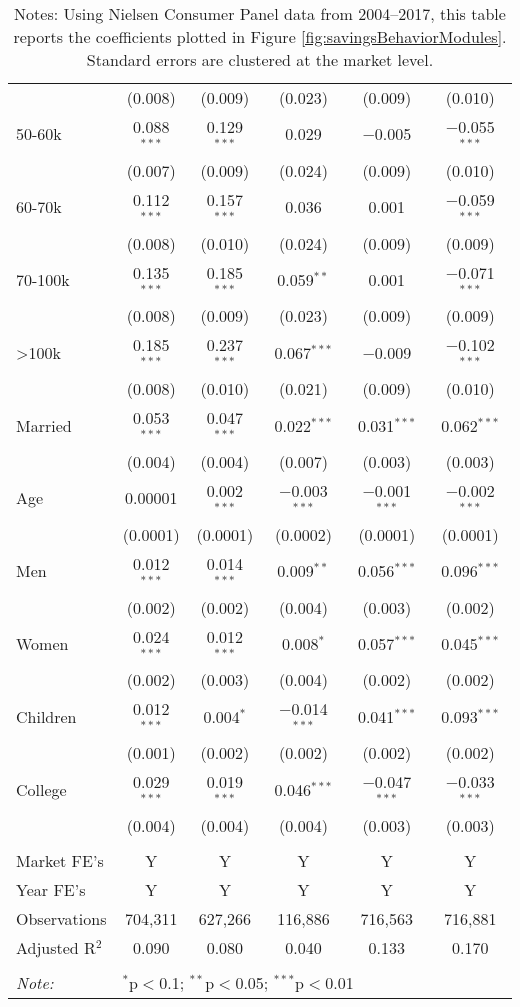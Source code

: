 \begin{table}[!htbp]
{\begin{tabular}{@{\extracolsep{5pt}}lccccc}
  & (0.008) & (0.009) & (0.023) & (0.009) & (0.010) \\
  50-60k & 0.088$^{***}$ & 0.129$^{***}$ & 0.029 & $-$0.005 & $-$0.055$^{***}$ \\
  & (0.007) & (0.009) & (0.024) & (0.009) & (0.010) \\
  60-70k & 0.112$^{***}$ & 0.157$^{***}$ & 0.036 & 0.001 & $-$0.059$^{***}$ \\
  & (0.008) & (0.010) & (0.024) & (0.009) & (0.009) \\
  70-100k & 0.135$^{***}$ & 0.185$^{***}$ & 0.059$^{**}$ & 0.001 & $-$0.071$^{***}$ \\
  & (0.008) & (0.009) & (0.023) & (0.009) & (0.009) \\
  >100k & 0.185$^{***}$ & 0.237$^{***}$ & 0.067$^{***}$ & $-$0.009 & $-$0.102$^{***}$ \\
  & (0.008) & (0.010) & (0.021) & (0.009) & (0.010) \\
  Married & 0.053$^{***}$ & 0.047$^{***}$ & 0.022$^{***}$ & 0.031$^{***}$ & 0.062$^{***}$ \\
  & (0.004) & (0.004) & (0.007) & (0.003) & (0.003) \\
  Age & 0.00001 & 0.002$^{***}$ & $-$0.003$^{***}$ & $-$0.001$^{***}$ & $-$0.002$^{***}$ \\
  & (0.0001) & (0.0001) & (0.0002) & (0.0001) & (0.0001) \\
  Men & 0.012$^{***}$ & 0.014$^{***}$ & 0.009$^{**}$ & 0.056$^{***}$ & 0.096$^{***}$ \\
  & (0.002) & (0.002) & (0.004) & (0.003) & (0.002) \\
  Women & 0.024$^{***}$ & 0.012$^{***}$ & 0.008$^{*}$ & 0.057$^{***}$ & 0.045$^{***}$ \\
  & (0.002) & (0.003) & (0.004) & (0.002) & (0.002) \\
  Children & 0.012$^{***}$ & 0.004$^{*}$ & $-$0.014$^{***}$ & 0.041$^{***}$ & 0.093$^{***}$ \\
  & (0.001) & (0.002) & (0.002) & (0.002) & (0.002) \\
  College & 0.029$^{***}$ & 0.019$^{***}$ & 0.046$^{***}$ & $-$0.047$^{***}$ & $-$0.033$^{***}$ \\
  & (0.004) & (0.004) & (0.004) & (0.003) & (0.003) \\
 \hline \\[-1.8ex]
Market FE's & Y & Y & Y & Y & Y \\
Year FE's & Y & Y & Y & Y & Y \\
Observations & 704,311 & 627,266 & 116,886 & 716,563 & 716,881 \\
Adjusted R$^{2}$ & 0.090 & 0.080 & 0.040 & 0.133 & 0.170 \\
\hline
\hline \\[-1.8ex]
\textit{Note:}  & \multicolumn{5}{l}{$^{*}$p$<$0.1; $^{**}$p$<$0.05; $^{***}$p$<$0.01} \\
\end{tabular}
}
\caption*{Notes: Using Nielsen Consumer Panel data from 2004--2017, this table reports the coefficients plotted in Figure \ref{fig:savingsBehaviorModules}. Standard errors are clustered at the market level.}
\end{table}
